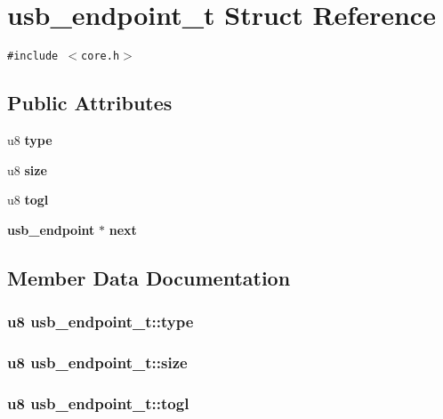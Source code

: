 \section{usb\_\-endpoint\_\-t Struct Reference}
\label{structusb__endpoint__t}
{\tt \#include $<$core.h$>$}

\subsection*{Public Attributes}
\begin{CompactItemize}
\item 
u8 {\bf type}
\item 
u8 {\bf size}
\item 
u8 {\bf togl}
\item 
{\bf usb\_\-endpoint} $\ast$ {\bf next}
\end{CompactItemize}


\subsection{Member Data Documentation}
\subsubsection{\setlength{\rightskip}{0pt plus 5cm}u8 {\bf usb\_\-endpoint\_\-t::type}}\label{structusb__endpoint__t_546b742c56dfa1e3cc158bc4dff76e88}


\subsubsection{\setlength{\rightskip}{0pt plus 5cm}u8 {\bf usb\_\-endpoint\_\-t::size}}\label{structusb__endpoint__t_043b2e37d9b3ef619f090445ff49aca1}


\subsubsection{\setlength{\rightskip}{0pt plus 5cm}u8 {\bf usb\_\-endpoint\_\-t::togl}}\label{structusb__endpoint__t_b62295ea69335318f8375d7bcbbd946a}


